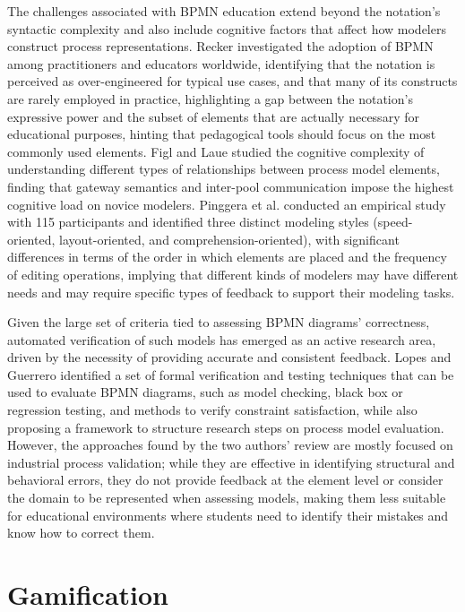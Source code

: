 The challenges associated with BPMN education extend beyond the notation's syntactic complexity and also include cognitive factors that affect how modelers construct process representations. Recker \cite{recker2010opportunities} investigated the adoption of BPMN among practitioners and educators worldwide, identifying that the notation is perceived as over-engineered for typical use cases, and that many of its constructs are rarely employed in practice, highlighting a gap between the notation's expressive power and the subset of elements that are actually necessary for educational purposes, hinting that pedagogical tools should focus on the most commonly used elements. Figl and Laue \cite{figl2011cognitive} studied the cognitive complexity of understanding different types of relationships between process model elements, finding that gateway semantics and inter-pool communication impose the highest cognitive load on novice modelers. Pinggera et al. \cite{pinggera2015styles} conducted an empirical study with 115 participants and identified three distinct modeling styles (speed-oriented, layout-oriented, and comprehension-oriented), with significant differences in terms of the order in which elements are placed and the frequency of editing operations, implying that different kinds of modelers may have different needs and may require specific types of feedback to support their modeling tasks.

Given the large set of criteria tied to assessing BPMN diagrams' correctness, automated verification of such models has emerged as an active research area, driven by the necessity of providing accurate and consistent feedback. Lopes and Guerrero \cite{lopes2023assessing} identified a set of formal verification and testing techniques that can be used to evaluate BPMN diagrams, such as model checking, black box or regression testing, and methods to verify constraint satisfaction, while also proposing a framework to structure research steps on process model evaluation. However, the approaches found by the two authors' review are mostly focused on industrial process validation; while they are effective in identifying structural and behavioral errors, they do not provide feedback at the element level or consider the domain to be represented when assessing models, making them less suitable for educational environments where students need to identify their mistakes and know how to correct them.


\section{Gamification}

